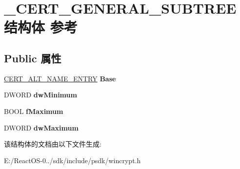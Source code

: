 \hypertarget{struct___c_e_r_t___g_e_n_e_r_a_l___s_u_b_t_r_e_e}{}\section{\+\_\+\+C\+E\+R\+T\+\_\+\+G\+E\+N\+E\+R\+A\+L\+\_\+\+S\+U\+B\+T\+R\+E\+E结构体 参考}
\label{struct___c_e_r_t___g_e_n_e_r_a_l___s_u_b_t_r_e_e}
\subsection*{Public 属性}
\begin{DoxyCompactItemize}
\item 
\mbox{\label{struct___c_e_r_t___g_e_n_e_r_a_l___s_u_b_t_r_e_e_a5d80a95e2ee5b9bc72160a4ea25cf7c2}} 
\hyperlink{struct___c_e_r_t___a_l_t___n_a_m_e___e_n_t_r_y}{C\+E\+R\+T\+\_\+\+A\+L\+T\+\_\+\+N\+A\+M\+E\+\_\+\+E\+N\+T\+RY} {\bfseries Base}
\item 
\mbox{\label{struct___c_e_r_t___g_e_n_e_r_a_l___s_u_b_t_r_e_e_aa45f525d1dc155cef2ba43deb6f9de5c}} 
D\+W\+O\+RD {\bfseries dw\+Minimum}
\item 
\mbox{\label{struct___c_e_r_t___g_e_n_e_r_a_l___s_u_b_t_r_e_e_a452b7d6453d466604cf20770b8ec2d9f}} 
B\+O\+OL {\bfseries f\+Maximum}
\item 
\mbox{\label{struct___c_e_r_t___g_e_n_e_r_a_l___s_u_b_t_r_e_e_a473856d3ce486e9298f638fc05028d6c}} 
D\+W\+O\+RD {\bfseries dw\+Maximum}
\end{DoxyCompactItemize}


该结构体的文档由以下文件生成\+:\begin{DoxyCompactItemize}
\item 
E\+:/\+React\+O\+S-\/0../sdk/include/psdk/wincrypt.\+h\end{DoxyCompactItemize}
